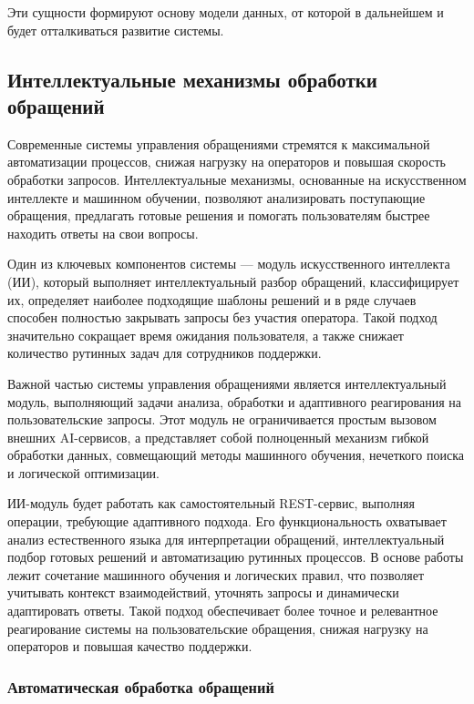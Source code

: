 Эти сущности формируют основу модели данных, от которой в дальнейшем и будет отталкиваться развитие системы.

\subsection{Интеллектуальные механизмы обработки обращений}

Современные системы управления обращениями стремятся к максимальной автоматизации процессов, снижая нагрузку на операторов и повышая скорость обработки запросов. Интеллектуальные механизмы, основанные на искусственном интеллекте и машинном обучении, позволяют анализировать поступающие обращения, предлагать готовые решения и помогать пользователям быстрее находить ответы на свои вопросы.

Один из ключевых компонентов системы — модуль искусственного интеллекта (ИИ), который выполняет интеллектуальный разбор обращений, классифицирует их, определяет наиболее подходящие шаблоны решений и в ряде случаев способен полностью закрывать запросы без участия оператора. Такой подход значительно сокращает время ожидания пользователя, а также снижает количество рутинных задач для сотрудников поддержки.

Важной частью системы управления обращениями является интеллектуальный модуль, выполняющий задачи анализа, обработки и адаптивного реагирования на пользовательские запросы. Этот модуль не ограничивается простым вызовом внешних AI-сервисов, а представляет собой полноценный механизм гибкой обработки данных, совмещающий методы машинного обучения, нечеткого поиска и логической оптимизации.

ИИ-модуль будет работать как самостоятельный REST-сервис, выполняя операции, требующие адаптивного подхода. Его функциональность охватывает анализ естественного языка для интерпретации обращений, интеллектуальный подбор готовых решений и автоматизацию рутинных процессов. В основе работы лежит сочетание машинного обучения и логических правил, что позволяет учитывать контекст взаимодействий, уточнять запросы и динамически адаптировать ответы. Такой подход обеспечивает более точное и релевантное реагирование системы на пользовательские обращения, снижая нагрузку на операторов и повышая качество поддержки.

\subsubsection{Автоматическая обработка обращений}

